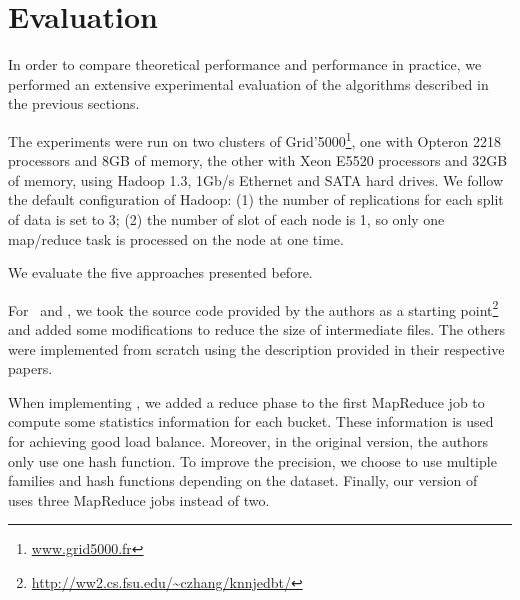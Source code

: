 \section{Evaluation}\label{evaluation}
In order to compare theoretical performance and performance in practice, we performed an extensive experimental evaluation of the algorithms described in the 
previous sections.

The experiments were run on two clusters of Grid'5000\footnote{\url{www.grid5000.fr}}, one with Opteron 2218 processors 
and 8GB of memory, the other with Xeon E5520 processors and 32GB of memory, using Hadoop 1.3, 1Gb/s Ethernet and SATA hard drives. %
We follow the default configuration of 
Hadoop: (1) the number of 
replications for each split of data is set 
to 3; (2) the number of slot of each node is 1, so only one map/reduce task is processed on the node at one time.

We evaluate the five approaches presented before.
%
%
%
%
%
%
%

 For \Z~and \HBNLJ, we took the source code provided by the authors as a starting 
point\footnote{\url{http://ww2.cs.fsu.edu/~czhang/knnjedbt/}} and added some modifications to reduce the size of 
intermediate files. The others were implemented from scratch using the 
description provided in their respective papers.

When implementing \LSH, we added a reduce phase to the first MapReduce job to compute some statistics information for 
each bucket. These information is used for achieving good load balance. %
Moreover, in the original version, the authors only use one 
hash function. To improve the precision, we choose to use multiple families and hash functions depending on the 
dataset. Finally, our version of \LSH~ uses three MapReduce jobs instead of two.

